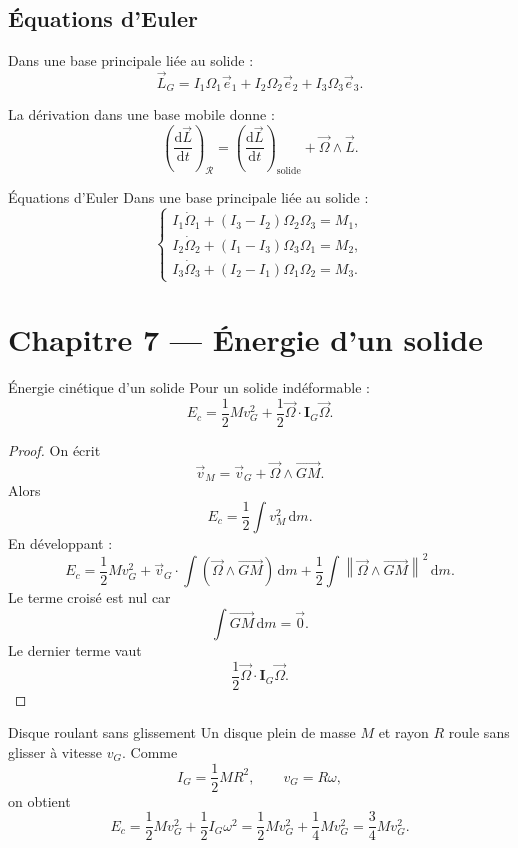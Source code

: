 \documentclass[11pt,a4paper]{article}
\newcommand{\vect}[1]{\overrightarrow{#1}}
\newcommand{\dd}{\,\mathrm{d}}
\newcommand{\der}[2]{\frac{\mathrm{d}#1}{\mathrm{d}#2}}
\newcommand{\norm}[1]{\left\lVert #1 \right\rVert}
\newcommand{\mat}[1]{\mathbf{#1}}
\newcommand{\Rep}{\mathcal R}
\begin{document}
\subsection{Équations d'Euler}

Dans une base principale liée au solide :
\[
\vec L_G=I_1\Omega_1\vec e_1+I_2\Omega_2\vec e_2+I_3\Omega_3\vec e_3.
\]

La dérivation dans une base mobile donne :
\[
\left(\der{\vec L}{t}\right)_{\Rep}
=
\left(\der{\vec L}{t}\right)_{\text{solide}}
+
\vec\Omega\wedge\vec L.
\]

\begin{theoremBox}{Équations d'Euler}{}
Dans une base principale liée au solide :
\[
\begin{cases}
I_1\dot\Omega_1+(I_3-I_2)\Omega_2\Omega_3=M_1,\\
I_2\dot\Omega_2+(I_1-I_3)\Omega_3\Omega_1=M_2,\\
I_3\dot\Omega_3+(I_2-I_1)\Omega_1\Omega_2=M_3.
\end{cases}
\]
\end{theoremBox}

\section{Chapitre 7 — Énergie d'un solide}

\begin{theoremBox}{Énergie cinétique d'un solide}{}
Pour un solide indéformable :
\[
E_c=\frac12 Mv_G^2+\frac12\vec\Omega\cdot\mat I_G\vec\Omega.
\]
\end{theoremBox}

\begin{proof}
On écrit
\[
\vec v_M=\vec v_G+\vec\Omega\wedge\vect{GM}.
\]
Alors
\[
E_c=\frac12\int v_M^2\dd m.
\]
En développant :
\[
E_c=\frac12 Mv_G^2
+\vec v_G\cdot\int(\vec\Omega\wedge\vect{GM})\dd m
+\frac12\int\norm{\vec\Omega\wedge\vect{GM}}^2\dd m.
\]
Le terme croisé est nul car
\[
\int\vect{GM}\dd m=\vec 0.
\]
Le dernier terme vaut
\[
\frac12\vec\Omega\cdot\mat I_G\vec\Omega.
\]
\end{proof}

\begin{examplebox}{Disque roulant sans glissement}{}
Un disque plein de masse $M$ et rayon $R$ roule sans glisser à vitesse $v_G$.
Comme
\[
I_G=\frac12MR^2,
\qquad
v_G=R\omega,
\]
on obtient
\[
E_c=\frac12Mv_G^2+\frac12I_G\omega^2
=\frac12Mv_G^2+\frac14Mv_G^2
=\frac34Mv_G^2.
\]
\end{examplebox}
\end{document}
